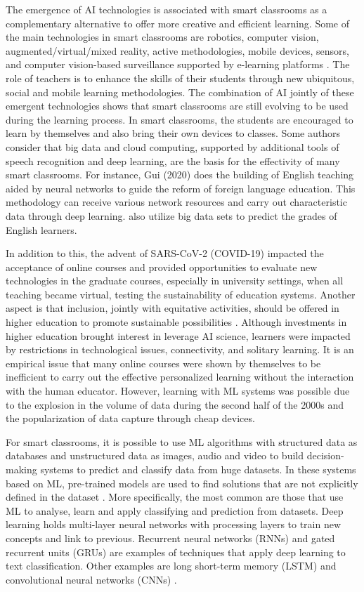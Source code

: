 \documentclass[english]{textolivre}
\begin{document}
The emergence of AI technologies is associated with smart classrooms as
a complementary alternative to offer more creative and efficient
learning. Some of the main technologies in smart classrooms are
robotics, computer vision, augmented/virtual/mixed reality, active
methodologies, mobile devices, sensors, and computer vision-based
surveillance supported by e-learning platforms \cite{Dimitriadou2022}.
The role of teachers is to enhance the skills of their students through
new ubiquitous, social and mobile learning methodologies. The
combination of AI jointly of these emergent technologies shows that
smart classrooms are still evolving to be used during the learning
process. In smart classrooms, the students are encouraged to learn by
themselves and also bring their own devices to classes. Some authors
consider that big data and cloud computing, supported by additional
tools of speech recognition and deep learning, are the basis for the
effectivity of many smart classrooms. For instance, Gui (2020) does the
building of English teaching aided by neural networks to guide the
reform of foreign language education. This methodology can receive
various network resources and carry out characteristic data through deep
learning. \textcite{Li2023} also utilize big data sets to predict
the grades of English learners.

In addition to this, the advent of SARS-CoV-2 (COVID-19) impacted the
acceptance of online courses and provided opportunities to evaluate new
technologies in the graduate courses, especially in university settings,
when all teaching became virtual, testing the sustainability of
education systems. Another aspect is that inclusion, jointly with
equitative activities, should be offered in higher education to promote
sustainable possibilities \cite{Chai2024}. Although investments in
higher education brought interest in leverage AI science, learners were
impacted by restrictions in technological issues, connectivity, and
solitary learning. It is an empirical issue that many online courses
were shown by themselves to be inefficient to carry out the effective
personalized learning without the interaction with the human educator.
However, learning with ML systems was possible due to the explosion in
the volume of data during the second half of the 2000s and the
popularization of data capture through cheap devices.

For smart classrooms, it is possible to use ML algorithms with
structured data as databases and unstructured data as images, audio and
video to build decision-making systems to predict and classify data from
huge datasets. In these systems based on ML, pre-trained models are used
to find solutions that are not explicitly defined in the dataset
\cite{Shaik2022}. More specifically, the most common are those that use
ML to analyse, learn and apply classifying and prediction from datasets.
Deep learning holds multi-layer neural networks with
processing layers to train new concepts and link to previous. Recurrent
neural networks (RNNs) and gated recurrent units (GRUs) are examples of
techniques that apply deep learning to text classification. Other
examples are long short-term memory (LSTM) and convolutional neural
networks (CNNs) \cite{Shaik2022}.
\end{document}
